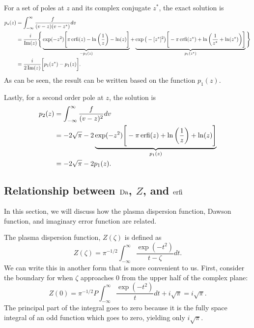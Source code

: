 For a set of poles at $z$ and its complex conjugate $z^*$, the exact solution is
\begin{align}
	p_*(z) &=  \int_{-\infty}^\infty \frac{f}{(v-z)(v-z^*)} dv  \nonumber \\
	&= \frac{i}{\operatorname{Im}(z)} \Bigg\{ \underbrace{\exp(-z^2) \Bigg[ \pi \operatorname{erfi}(z) - \ln\bigg(\frac{1}{z}\bigg) - \ln(z)  \Bigg]}_{-p_1(z)}
	+ \underbrace{\exp\big(-[z^*]^2\big) \Bigg[ -\pi \operatorname{erfi}(z^*) + \ln \bigg(\frac{1}{z^*} + \ln(z^*) \bigg) \Bigg]}_{p_1(z^*)}
	\Bigg\}	\nonumber \\
	&= \frac{i}{2\operatorname{Im}(z)} \bigg[ p_1(z^*) - p_1(z) \bigg].
\end{align}
As can be seen, the result can be written based on the function $p_1(z)$.

Lastly, for a second order pole at $z$, the solution is
\begin{align}
	p_2(z) &= \int_{-\infty}^\infty \frac{f}{(v-z)^2} dv  \nonumber \\
	&= -2 \sqrt{\pi} - 2\underbrace{ \exp(-z^2) \Bigg[ -\pi \operatorname{erfi}(z) + \ln\bigg(\frac{1}{z}\bigg) + \ln(z)  \Bigg]}_{p_1(z)} \nonumber \\
	&= -2 \sqrt{\pi} - 2 p_1(z).
\end{align}

\subsection{Relationship between $\operatorname{Da}$, $Z$, and $\operatorname{erfi}$}
In this section, we will discuss how the plasma dispersion function, Dawson function, and imaginary error function are related.

The plasma dispersion function, $Z(\zeta)$ is defined as
\begin{equation}
	Z(\zeta) = \pi^{-1/2} \int_{-\infty}^{\infty} 
	\frac{\exp(-t^2)}{t-\zeta} dt.
	\label{eq:plasma-dispersion-function}
\end{equation}
We can write this in another form that is more convenient to us. 
First, consider the boundary for when $\zeta$ approaches 0 from the upper half of the complex plane:
\begin{equation}
	Z(0) = \pi^{-1/2}P\int_{-\infty}^\infty 
	\frac{\exp(-t^2)}{t}dt + i \sqrt{\pi} = i \sqrt{\pi}.
	\label{eq:Z0}
\end{equation}
The principal part of the integral goes to zero because it is the fully space integral of an odd function which goes to zero, yielding only $i\sqrt{\pi}$.

